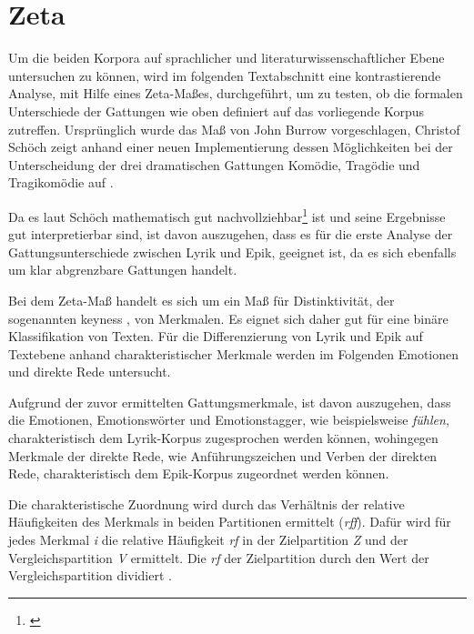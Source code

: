 \documentclass[a4paper,10p]{article}
\begin{document}
\section{Zeta}
Um die beiden Korpora auf sprachlicher und literaturwissenschaftlicher Ebene untersuchen zu können, wird im folgenden Textabschnitt eine kontrastierende Analyse, mit Hilfe eines Zeta-Maßes, durchgeführt, um zu testen, ob die formalen Unterschiede der Gattungen wie oben definiert auf das vorliegende Korpus zutreffen. Ursprünglich wurde das Maß von John Burrow vorgeschlagen, Christof Schöch zeigt anhand einer neuen Implementierung dessen Möglichkeiten bei der Unterscheidung der drei dramatischen Gattungen Komödie, Tragödie und Tragikomödie auf \citep[vgl.][S. 77 f.]{SchöchZeta}. \par 

Da es laut  Schöch \glqq mathematisch gut nachvollziehbar\grqq \footnote{\citep[S. 78]{SchöchZeta}} ist und seine Ergebnisse gut interpretierbar sind, ist davon auszugehen, dass es für die erste Analyse der Gattungsunterschiede zwischen Lyrik und Epik, geeignet ist, da es sich ebenfalls um klar abgrenzbare Gattungen handelt.\par 

Bei dem Zeta-Maß handelt es sich um ein Maß für Distinktivität, der sogenannten \glq keyness \grq, von Merkmalen. Es eignet sich daher gut für eine binäre Klassifikation von Texten. Für die Differenzierung von Lyrik und Epik auf Textebene anhand charakteristischer Merkmale werden im Folgenden Emotionen und direkte Rede untersucht. \par 

Aufgrund der zuvor ermittelten Gattungsmerkmale, ist davon auszugehen, dass die Emotionen, Emotionswörter und Emotionstagger, wie beispielsweise \textit{fühlen}, charakteristisch dem Lyrik-Korpus zugesprochen werden können, wohingegen Merkmale der direkte Rede, wie Anführungszeichen und Verben der direkten Rede, charakteristisch dem Epik-Korpus zugeordnet werden können. \par 

Die charakteristische Zuordnung wird durch das Verhältnis der relative Häufigkeiten des Merkmals in beiden Partitionen ermittelt (\textit{rff}). Dafür wird für jedes Merkmal \textit{i} die relative Häufigkeit \textit{rf} in der Zielpartition \textit{Z} und der Vergleichspartition \textit{V} ermittelt. Die \textit{rf} der Zielpartition durch den Wert der Vergleichspartition dividiert \citep[vgl.][S. 79 f.]{SchöchZeta}.\\
\end{document}
